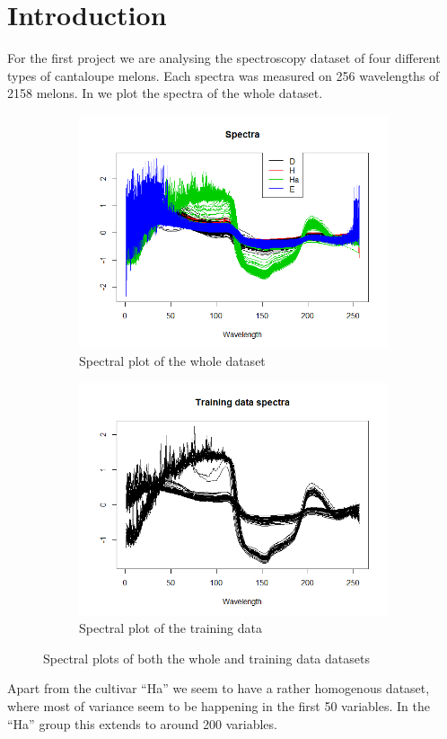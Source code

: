 \documentclass[12pt]{article}
\begin{document}
\section{Introduction}
For the first project we are analysing the spectroscopy dataset of four different types of cantaloupe melons. Each spectra was measured on 256 wavelengths of 2158 melons.
In \label{fig:spectra} we plot the spectra of the whole dataset.
\begin{figure}[h!]
    \begin{subfigure}[b]{0.5\linewidth}
        \centering
        \includegraphics[width=\textwidth]{../images/spectra.png}
     \caption{Spectral plot of the whole dataset}\label{fig:spectra}
    \end{subfigure}%
    \begin{subfigure}[b]{0.5\linewidth}
        \centering
     \includegraphics[width=\textwidth]{../images/trainDataSpectra.png}
     \caption{Spectral plot of the training data}\label{fig:trainDataSpectra}
    \end{subfigure}%
   \caption{Spectral plots of both the whole and training data datasets}
\end{figure}
Apart from the cultivar ``Ha'' we seem to have a rather homogenous dataset, where most of variance seem to be happening in the first 50 variables. In the ``Ha'' group this 
extends to around 200 variables.
\end{document}
